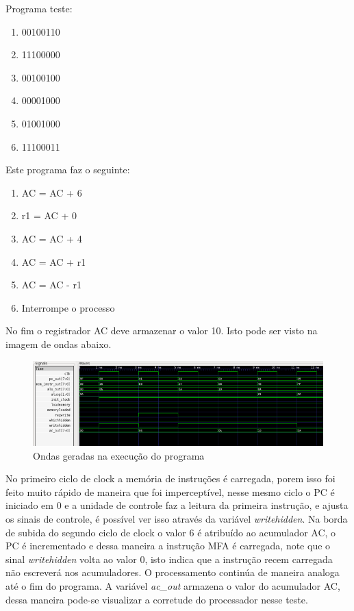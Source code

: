 \documentclass[12pt]{article}
\begin{document}
Programa teste:
\begin{enumerate}
  \item 00100110
  \item 11100000
  \item 00100100
  \item 00001000
  \item 01001000
  \item 11100011
\end{enumerate}
Este programa faz o seguinte:
\begin{enumerate}
  \item AC = AC + 6
  \item r1 = AC + 0
  \item AC = AC + 4
  \item AC = AC + r1
  \item AC = AC - r1
  \item Interrompe o processo
\end{enumerate}
No fim o registrador AC deve armazenar o valor 10.
Isto pode ser visto na imagem de ondas abaixo.
\begin{figure}[ht]
\centering
\includegraphics[width=1\textwidth]{onda.png}
\caption{Ondas geradas na execução do programa}
\label{fig:Arquivo de Ondas}
\end{figure}

No primeiro ciclo de clock a memória de instruções é carregada, porem isso foi feito muito rápido de maneira que foi imperceptível, nesse mesmo ciclo o PC é iniciado em 0 e a unidade de controle faz a leitura da primeira instrução, e ajusta os sinais de controle, é possível ver isso através da variável \textit{writehidden}.
Na borda de subida do segundo ciclo de clock o valor 6 é atribuído ao acumulador AC, o PC é incrementado e dessa maneira a instrução MFA é carregada, note que o sinal \textit{writehidden} volta ao valor 0, isto indica que a instrução recem carregada não escreverá nos acumuladores.
O processamento continúa de maneira analoga até o fim do programa. A variável \textit{ac\_out} armazena o valor do acumulador AC, dessa maneira
 pode-se visualizar a corretude do processador nesse teste.
\end{document}
